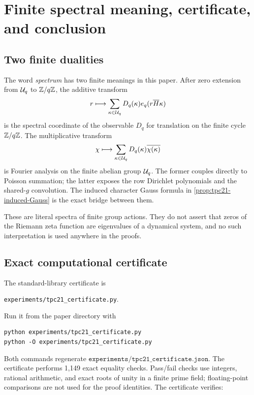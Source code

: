\section{Finite spectral meaning, certificate, and conclusion}
\label{sec:tpc21-certificate}

\subsection{Two finite dualities}

The word \emph{spectrum} has two finite meanings in this paper.  After
zero extension from \(\mathcal U_q\) to \(\mathbb Z/q\mathbb Z\), the additive transform
\[
 r\longmapsto
 \sum_{\kappa\in\mathcal U_q}D_q(\kappa)e_q(r\overline H\kappa)
\]
is the spectral coordinate of the observable \(D_q\) for translation
on the finite cycle \(\mathbb Z/q\mathbb Z\).  The multiplicative transform
\[
 \chi\longmapsto
 \sum_{\kappa\in\mathcal U_q}D_q(\kappa)\overline{\chi(\kappa)}
\]
is Fourier analysis on the finite abelian group \(\mathcal U_q\).  The former
couples directly to Poisson summation; the latter exposes the row
Dirichlet polynomials and the shared-\(g\) convolution.  The induced
character Gauss formula in \cref{prop:tpc21-induced-Gauss} is the exact
bridge between them.

These are literal spectra of finite group actions.  They do not assert
that zeros of the Riemann zeta function are eigenvalues of a dynamical
system, and no such interpretation is used anywhere in the proofs.

\subsection{Exact computational certificate}

The standard-library certificate is
\begin{center}
 \texttt{experiments/tpc21\_certificate.py}.
\end{center}
Run it from the paper directory with
\begin{verbatim}
python experiments/tpc21_certificate.py
python -O experiments/tpc21_certificate.py
\end{verbatim}
Both commands regenerate
\(\texttt{experiments/tpc21\_certificate.json}\).  The certificate performs
1,149 exact equality checks.  Pass/fail checks use
integers, rational arithmetic, and exact roots of unity in a finite
prime field; floating-point comparisons are not used for the proof
identities.  The certificate verifies:

